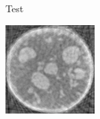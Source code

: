 \documentclass[journal]{IEEEtran}
\begin{document}
\begin{figure}[!h]
    \begin{subfigure}[b]{0.29\linewidth}
        \caption{Test}
     \end{subfigure}
\quad
    \begin{subfigure}[b]{0.3\linewidth}
        \includegraphics[width=\textwidth]{../images/sprouts/fdkIm.png}

\end{subfigure}
\end{figure}
\end{document}
